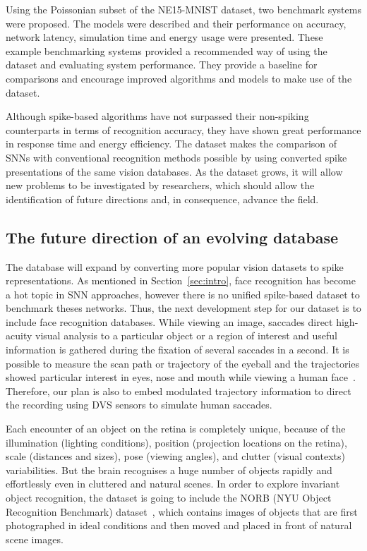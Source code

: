 \documentclass{frontiersENG} %
\begin{document}
Using the Poissonian subset of the NE15-MNIST dataset, two benchmark systems were proposed. 
The models were described and their performance on accuracy, network latency, simulation time and energy usage were presented.
These example benchmarking systems provided a recommended way of using the dataset and evaluating system performance.
They provide a baseline for comparisons and encourage improved algorithms and models to make use of the dataset.

Although spike-based algorithms have not surpassed their non-spiking counterparts in terms of recognition accuracy, they have shown great performance in response time and energy efficiency.
The dataset makes the comparison of SNNs with conventional recognition methods possible by using converted spike presentations of the same vision databases.
As the dataset grows, it will allow new problems to be investigated by researchers, which should allow the identification of future directions and, in consequence, advance the field.

\subsection{The future direction of an evolving database}
The database will expand by converting more popular vision datasets to spike representations.
As mentioned in Section~\ref{sec:intro}, face recognition has become a hot topic in SNN approaches, however there is no unified spike-based dataset to benchmark theses networks.
Thus, the next development step for our dataset is to include face recognition databases.
While viewing an image,  saccades direct high-acuity visual analysis to a particular object or a region of interest and useful information is gathered during the fixation of several saccades in a second.
It is possible to measure the scan path or trajectory of the eyeball and the trajectories showed particular interest in eyes, nose and mouth while viewing a human face~\citep{yarbus1967eye}.
Therefore, our plan is also to embed modulated trajectory information to direct the recording using DVS sensors to simulate human saccades.


Each encounter of an object on the retina is completely unique, because of the illumination (lighting conditions), position (projection locations on the retina), scale (distances and sizes), pose (viewing angles), and clutter (visual contexts) variabilities.
But the brain recognises a huge number of objects rapidly and effortlessly even in cluttered and natural scenes.
In order to explore invariant object recognition, the dataset is going to include the NORB (NYU Object Recognition Benchmark) dataset~\citep{lecun2004learning}, which contains images of objects that are first photographed in ideal conditions and then moved and placed in front of natural scene images.
\end{document}
